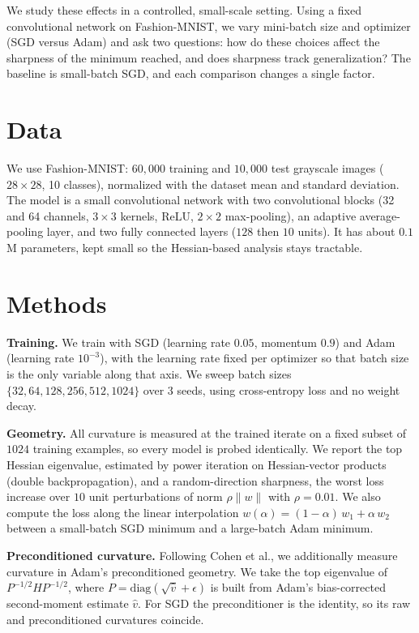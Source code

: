 \documentclass[a4paper,10pt,twoside]{article}
\begin{document}
We study these effects in a controlled, small-scale setting. Using a fixed convolutional network on Fashion-MNIST, we vary mini-batch size and optimizer (SGD versus Adam) and ask two questions: how do these choices affect the sharpness of the minimum reached, and does sharpness track generalization? The baseline is small-batch SGD, and each comparison changes a single factor.

\section{Data}
We use Fashion-MNIST: $60{,}000$ training and $10{,}000$ test grayscale images ($28\times28$, 10 classes), normalized with the dataset mean and standard deviation. The model is a small convolutional network with two convolutional blocks (32 and 64 channels, $3\times3$ kernels, ReLU, $2\times2$ max-pooling), an adaptive average-pooling layer, and two fully connected layers ($128$ then $10$ units). It has about $0.1$M parameters, kept small so the Hessian-based analysis stays tractable.

\section{Methods}
\textbf{Training.} We train with SGD (learning rate $0.05$, momentum $0.9$) and Adam (learning rate $10^{-3}$), with the learning rate fixed per optimizer so that batch size is the only variable along that axis. We sweep batch sizes $\{32, 64, 128, 256, 512, 1024\}$ over $3$ seeds, using cross-entropy loss and no weight decay.

\textbf{Geometry.} All curvature is measured at the trained iterate on a fixed subset of $1024$ training examples, so every model is probed identically. We report the top Hessian eigenvalue, estimated by power iteration on Hessian-vector products (double backpropagation), and a random-direction sharpness, the worst loss increase over $10$ unit perturbations of norm $\rho\lVert w\rVert$ with $\rho = 0.01$. We also compute the loss along the linear interpolation $w(\alpha) = (1-\alpha)\,w_1 + \alpha\,w_2$ between a small-batch SGD minimum and a large-batch Adam minimum.

\textbf{Preconditioned curvature.} Following Cohen et al., we additionally measure curvature in Adam's preconditioned geometry. We take the top eigenvalue of $P^{-1/2} H P^{-1/2}$, where $P = \mathrm{diag}(\sqrt{\hat{v}} + \epsilon)$ is built from Adam's bias-corrected second-moment estimate $\hat{v}$. For SGD the preconditioner is the identity, so its raw and preconditioned curvatures coincide.
\end{document}
